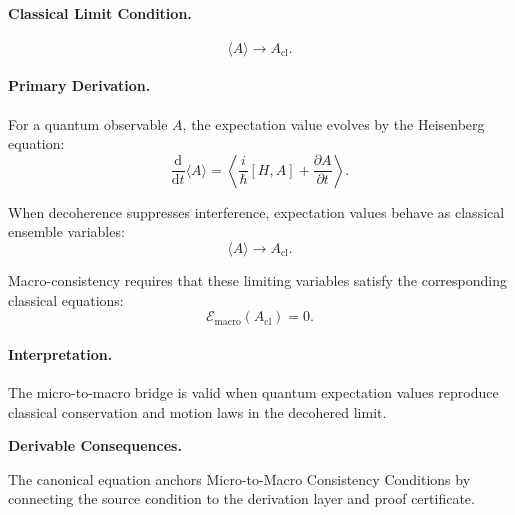 \paragraph{Classical Limit Condition.}
\begin{equation}
\langle A\rangle
\longrightarrow
A_{\mathrm{cl}} .
\end{equation}

\paragraph{Primary Derivation.}
For a quantum observable $A$, the expectation value evolves by the Heisenberg equation:
\begin{equation}
\frac{\mathrm{d}}{\mathrm{d}t}\langle A\rangle
=
\left\langle
\frac{i}{\hbar}[H,A]
+
\frac{\partial A}{\partial t}
\right\rangle .
\end{equation}

When decoherence suppresses interference, expectation values behave as classical ensemble variables:
\begin{equation}
\langle A\rangle
\rightarrow
A_{\mathrm{cl}}.
\end{equation}

Macro-consistency requires that these limiting variables satisfy the corresponding classical equations:
\begin{equation}
\boxed{
\mathcal{E}_{\mathrm{macro}}(A_{\mathrm{cl}})=0 .
}
\end{equation}

\paragraph{Interpretation.}
The micro-to-macro bridge is valid when quantum expectation values reproduce classical conservation and motion laws in the decohered limit.

\par\vspace{0.35em}
\noindent\textbf{Derivable Consequences.}\quad
\begingroup
\footnotesize
\raggedright
The canonical equation anchors Micro-to-Macro Consistency Conditions by connecting the source condition to the derivation layer and proof certificate.
\par\endgroup

